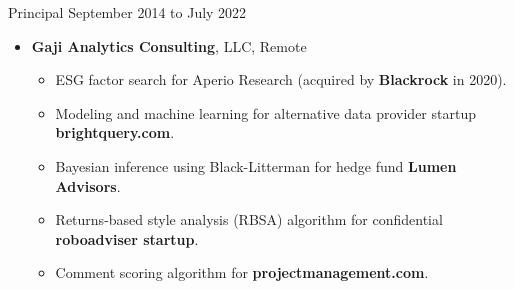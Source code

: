 \documentclass[11pt]{article}
\newenvironment{innerlist}[1][\enskip\textbullet]%
        {\begin{itemize}[#1,leftmargin=*,parsep=0pt,itemsep=0pt,topsep=0pt,partopsep=0pt]}
        {\end{itemize}}
\begin{document}
Principal \hfill{September 2014 to July 2022} 
\begin{innerlist}
	\item[]  \textbf{Gaji Analytics Consulting}, LLC, Remote
	\begin{innerlist}
		\item ESG factor search for Aperio Research (acquired by \textbf{Blackrock} in 2020).
		\item Modeling and machine learning for alternative data provider startup \textbf{brightquery.com}.
		\item Bayesian inference using Black-Litterman for hedge fund \textbf{Lumen Advisors}.
		\item Returns-based style analysis (RBSA) algorithm for confidential \textbf{roboadviser startup}.

		\item Comment scoring algorithm for \textbf{projectmanagement.com}.


\end{innerlist}
\end{innerlist}
\end{document}
